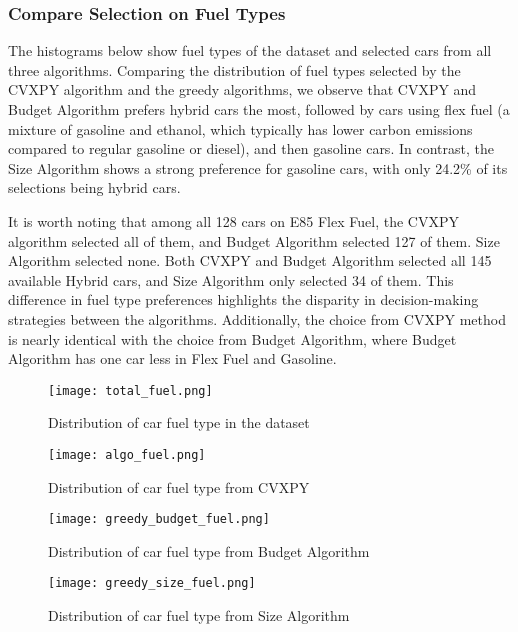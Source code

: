 \documentclass{article}
\begin{document}
\subsubsection{Compare Selection on Fuel Types}
The histograms below show fuel types of the dataset and selected cars from all three algorithms. Comparing the distribution of fuel types selected by the CVXPY algorithm and the greedy algorithms, we observe that CVXPY and Budget Algorithm prefers hybrid cars the most, followed by cars using flex fuel (a mixture of gasoline and ethanol, which typically has lower carbon emissions compared to regular gasoline or diesel), and then gasoline cars. In contrast, the Size Algorithm shows a strong preference for gasoline cars, with only 24.2\% of its selections being hybrid cars.\par It is worth noting that among all 128 cars on E85 Flex Fuel, the CVXPY algorithm selected all of them, and Budget Algorithm selected 127 of them. Size Algorithm selected none. Both CVXPY and Budget Algorithm selected all 145 available Hybrid cars, and Size Algorithm only selected 34 of them. This difference in fuel type preferences highlights the disparity in decision-making strategies between the algorithms. Additionally, the choice from CVXPY method is nearly identical with the choice from Budget Algorithm, where Budget Algorithm has one car less in Flex Fuel and Gasoline.\par
\begin{figure}[h]
    \centering
    \begin{minipage}{0.45\textwidth}
        \centering
        \texttt{[image: total\_fuel.png]}
        \caption{Distribution of car fuel type in the dataset}
        \label{fig:total_fuel}
    \end{minipage}\hfill
    \begin{minipage}{0.45\textwidth}
        \centering
        \texttt{[image: algo\_fuel.png]}
        \caption{Distribution of car fuel type from CVXPY}
        \label{fig:algo_fuel}
    \end{minipage}\hfill
    \begin{minipage}{0.45\textwidth}
        \centering
        \texttt{[image: greedy\_budget\_fuel.png]}
        \caption{Distribution of car fuel type from Budget Algorithm}
        \label{fig:greedy_budget_fuel}
    \end{minipage}\hfill
    \begin{minipage}{0.45\textwidth}
        \centering
        \texttt{[image: greedy\_size\_fuel.png]}
        \caption{Distribution of car fuel type from Size Algorithm}
        \label{fig:greedy_size_fuel}
    \end{minipage}
\end{figure}
\end{document}
